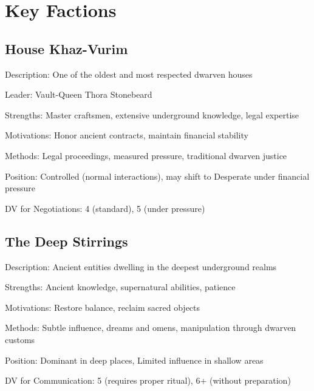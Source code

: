 \documentclass[11pt]{article}
\newenvironment{faction}[1]{\begin{description}[leftmargin=*,style=standard]\item[\textbf{#1}]}{\end{description}}
\begin{document}
\section{Key Factions}

\subsection{House Khaz-Vurim}
\begin{faction}{House Khaz-Vurim}
\item[Description:] One of the oldest and most respected dwarven houses
\item[Leader:] Vault-Queen Thora Stonebeard
\item[Strengths:] Master craftsmen, extensive underground knowledge, legal expertise
\item[Motivations:] Honor ancient contracts, maintain financial stability
\item[Methods:] Legal proceedings, measured pressure, traditional dwarven justice
\item[Position:] Controlled (normal interactions), may shift to Desperate under financial pressure
\item[DV for Negotiations:] 4 (standard), 5 (under pressure)
\end{faction}

\subsection{The Deep Stirrings}
\begin{faction}{The Deep Stirrings}
\item[Description:] Ancient entities dwelling in the deepest underground realms
\item[Strengths:] Ancient knowledge, supernatural abilities, patience
\item[Motivations:] Restore balance, reclaim sacred objects
\item[Methods:] Subtle influence, dreams and omens, manipulation through dwarven customs
\item[Position:] Dominant in deep places, Limited influence in shallow areas
\item[DV for Communication:] 5 (requires proper ritual), 6+ (without preparation)
\end{faction}
\end{document}
